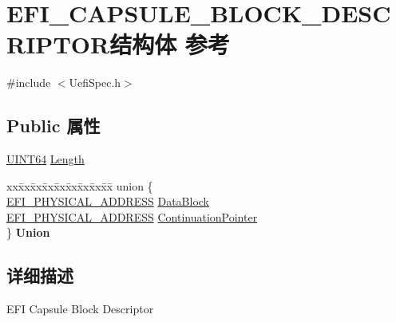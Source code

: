 \hypertarget{struct_e_f_i___c_a_p_s_u_l_e___b_l_o_c_k___d_e_s_c_r_i_p_t_o_r}{}\section{E\+F\+I\+\_\+\+C\+A\+P\+S\+U\+L\+E\+\_\+\+B\+L\+O\+C\+K\+\_\+\+D\+E\+S\+C\+R\+I\+P\+T\+O\+R结构体 参考}
\label{struct_e_f_i___c_a_p_s_u_l_e___b_l_o_c_k___d_e_s_c_r_i_p_t_o_r}


{\ttfamily \#include $<$Uefi\+Spec.\+h$>$}

\subsection*{Public 属性}
\begin{DoxyCompactItemize}
\item 
\hyperlink{_processor_bind_8h_a57be03562867144161c1bfee95ca8f7c}{U\+I\+N\+T64} \hyperlink{struct_e_f_i___c_a_p_s_u_l_e___b_l_o_c_k___d_e_s_c_r_i_p_t_o_r_a261499de5fae79ccdecfa7d3c4267a85}{Length}
\item 
\mbox{\label{struct_e_f_i___c_a_p_s_u_l_e___b_l_o_c_k___d_e_s_c_r_i_p_t_o_r_a60c3e34f99aa76cf98c83fd83ff41c2b}} 
\begin{tabbing}
xx\=xx\=xx\=xx\=xx\=xx\=xx\=xx\=xx\=\kill
union \{\\
\>\hyperlink{_uefi_base_type_8h_a31bc7e7faeab8d2940ee34f21d41cd04}{EFI\_PHYSICAL\_ADDRESS} \hyperlink{struct_e_f_i___c_a_p_s_u_l_e___b_l_o_c_k___d_e_s_c_r_i_p_t_o_r_a882989559588413da125f7b32adb86c5}{DataBlock}\\
\>\hyperlink{_uefi_base_type_8h_a31bc7e7faeab8d2940ee34f21d41cd04}{EFI\_PHYSICAL\_ADDRESS} \hyperlink{struct_e_f_i___c_a_p_s_u_l_e___b_l_o_c_k___d_e_s_c_r_i_p_t_o_r_ac157a68bd121284eb5230e26a97d0e54}{ContinuationPointer}\\
\} {\bfseries Union}\\

\end{tabbing}\end{DoxyCompactItemize}


\subsection{详细描述}
E\+FI Capsule Block Descriptor 

